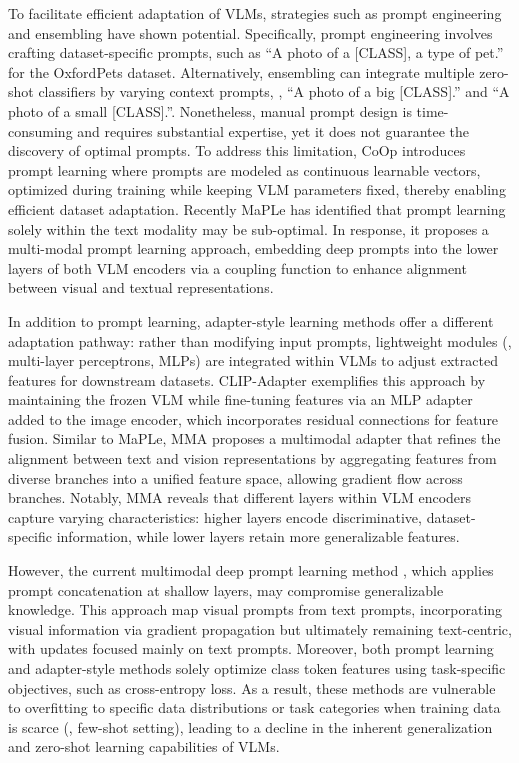 To facilitate efficient adaptation of VLMs, strategies such as prompt engineering and ensembling \cite{clip} have shown potential. Specifically, prompt engineering involves crafting dataset-specific prompts, such as ``A photo of a [CLASS], a type of pet.'' for the OxfordPets \cite{oxford_pets} dataset. Alternatively, ensembling can integrate multiple zero-shot classifiers by varying context prompts, \eg, ``A photo of a big [CLASS].'' and ``A photo of a small [CLASS].''. Nonetheless, manual prompt design is time-consuming and requires substantial expertise, yet it does not guarantee the discovery of optimal prompts. To address this limitation, CoOp \cite{coop} introduces prompt learning\cite{prompt_tuning} where prompts are modeled as continuous learnable vectors, optimized during training while keeping VLM parameters fixed, thereby enabling efficient dataset adaptation. Recently MaPLe \cite{maple} has identified that prompt learning solely within the text modality may be sub-optimal. In response, it proposes a multi-modal prompt learning approach, embedding deep prompts into the lower layers of both VLM encoders via a coupling function to enhance alignment between visual and textual representations.

In addition to prompt learning, adapter-style learning methods offer a different adaptation pathway: rather than modifying input prompts, lightweight modules (\eg, multi-layer perceptrons, MLPs) are integrated within VLMs to adjust extracted features for downstream datasets. CLIP-Adapter \cite{clip-adapter} exemplifies this approach by maintaining the frozen VLM while fine-tuning features via an MLP adapter added to the image encoder, which incorporates residual connections for feature fusion. Similar to MaPLe, MMA \cite{mma} proposes a multimodal adapter that refines the alignment between text and vision representations by aggregating features from diverse branches into a unified feature space, allowing gradient flow across branches. Notably, MMA reveals that different layers within VLM encoders capture varying characteristics: higher layers encode discriminative, dataset-specific information, while lower layers retain more generalizable features.

However, the current multimodal deep prompt learning method \cite{maple}, which applies prompt concatenation at shallow layers, may compromise generalizable knowledge. This approach map visual prompts from text prompts, incorporating visual information via gradient propagation but ultimately remaining text-centric, with updates focused mainly on text prompts. Moreover, both prompt learning and adapter-style methods solely optimize class token features using task-specific objectives, such as cross-entropy loss. As a result, these methods are vulnerable to overfitting to specific data distributions or task categories when training data is scarce (\eg, few-shot setting), leading to a decline in the inherent generalization and zero-shot learning capabilities of VLMs.


